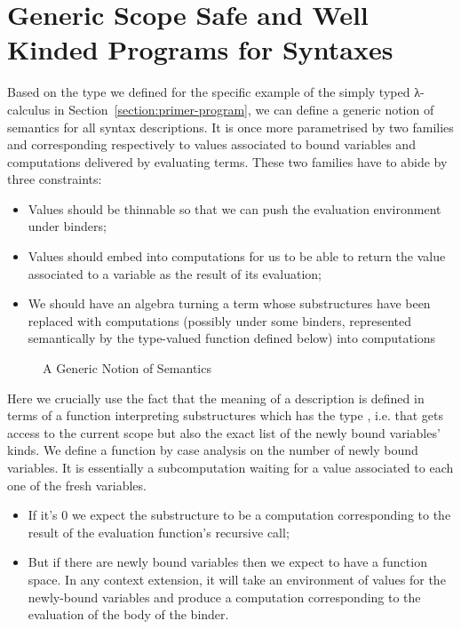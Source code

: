 

\section{Generic Scope Safe and Well Kinded Programs for Syntaxes}\label{section:semantics}

Based on the \semrec{} type we defined for the specific example of the
simply typed λ-calculus in Section~\ref{section:primer-program},
we can define a generic notion of
semantics for all syntax descriptions. It is once more parametrised
by two  families  and  corresponding
respectively to values associated to bound variables and
computations delivered by evaluating terms. These two families
have to abide by three constraints:
\begin{itemize}
\item{} Values should be thinnable so that we can push the
      evaluation environment under binders;
\item{} Values should embed into computations for us to be able
      to return the value associated to a variable as the
      result of its evaluation;
\item{} We should have an algebra turning
      a term whose substructures have been replaced with
      computations (possibly under some binders, represented semantically
      by the  type-valued function defined below) into computations
\end{itemize}

\begin{figure}[h]
\caption{A Generic Notion of Semantics}
\end{figure}

Here we crucially use the fact that the meaning of a description is
defined in terms of a function interpreting substructures which has
the type    , i.e. that gets access
to the current scope but also the exact list of the newly bound variables' kinds.
We define a function  by case analysis on the number of newly bound
variables. It is essentially a subcomputation waiting for a value associated to
each one of the fresh variables.
\begin{itemize}
\item If it's $0$ we expect the substructure to be a computation corresponding
    to the result of the evaluation function's recursive call;
  \item But if there are newly bound variables then we expect to have a function
    space. In any context extension, it will take an environment of values for
    the newly-bound variables and produce a computation corresponding to the
    evaluation of the body of the binder.
\end{itemize}

